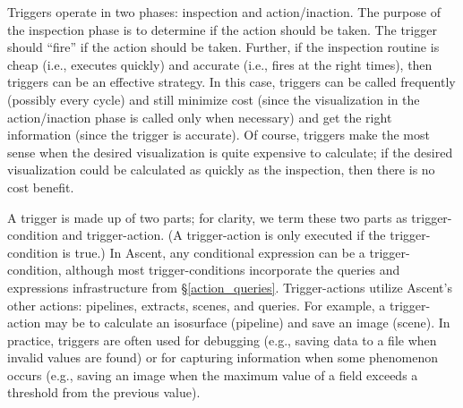 Triggers operate in two phases: inspection and action/inaction.
%
The purpose of the inspection phase is to determine if the action should be taken.
%
The trigger should ``fire'' if the action should be taken.
%
Further, if the inspection routine is cheap (i.e., executes quickly) and accurate (i.e.,
fires at the right times), then
triggers can be an effective strategy.
%
In this case, triggers can be called frequently (possibly every cycle) and still minimize cost
(since the visualization in the action/inaction phase is called only when necessary) and
get the right information (since the trigger is accurate).
%
Of course, triggers make the most sense when the desired visualization is quite expensive
to calculate;
if the desired visualization could be calculated as quickly as the inspection,
then there is no cost benefit.





%
%
%
%

A trigger is made up of two parts; for clarity, we term these two parts
as trigger-condition and trigger-action.
(A trigger-action is only executed if the trigger-condition is true.)
%
In Ascent, any conditional expression can be a trigger-condition, although most trigger-conditions
incorporate the queries and expressions infrastructure from
\S\ref{action_queries}.
%
Trigger-actions utilize Ascent's other actions: pipelines, extracts, scenes, and
queries.
%
For example, a trigger-action may be to calculate an isosurface (pipeline) and save
an image (scene).
%
In practice, triggers are often used for debugging (e.g., saving data to
a file when invalid values are found) or
for capturing information when some phenomenon occurs
(e.g., saving an image when the maximum value of a field exceeds a threshold from the
previous value).
%

